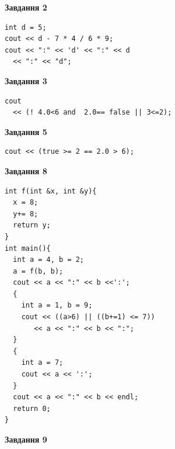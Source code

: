 \documentclass[12pt, ukrainian]{article}
\begin{document}
{\begin {large}
\begin{minipage}[t]{7.0cm}
\end{minipage}
\vline \hspace{1mm}
\begin{minipage}[t]{11.0cm}

\begin{center}
\textbf{Завдання 2}
\end{center}
\vspace{-8mm}

\begin{verbatim}
int d = 5;
cout << d - 7 * 4 / 6 * 9;
cout << ":" << 'd' << ":" << d 
  << ":" << "d";
\end{verbatim}



\begin{center}
\textbf{Завдання 3}
\end{center}
\vspace{-8mm}

\begin{verbatim}
cout 
  << (! 4.0<6 and  2.0== false || 3<=2);
\end{verbatim}



\begin{center}
\textbf{Завдання 5}
\end{center}
\vspace{-8mm}

\begin{verbatim}
cout << (true >= 2 == 2.0 > 6);
\end{verbatim}



\begin{center}
\textbf{Завдання 8}
\end{center}
\vspace{-8mm}

\begin{verbatim}
int f(int &x, int &y){
  x = 8;
  y+= 8;
  return y;
}
int main(){
  int a = 4, b = 2;
  a = f(b, b);
  cout << a << ":" << b <<':';
  {
    int a = 1, b = 9;
    cout << ((a>6) || ((b+=1) <= 7))
       << a << ":" << b << ":";
  }
  {
    int a = 7;
    cout << a << ':';
  }
  cout << a << ":" << b << endl;
  return 0;
}
\end{verbatim}

\end{minipage}


\begin{minipage}[t]{7.0cm}

\begin{center}
\textbf{Завдання 9}
\end{center}
\vspace{-8mm}


\end{minipage}
\end{large}}
\end{document}
